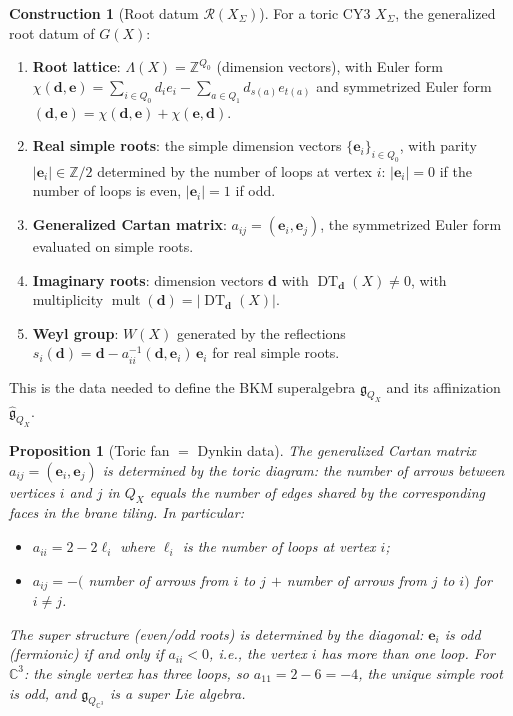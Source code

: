 \documentclass[11pt]{article}
\newtheorem{proposition}[theorem]{Proposition}
\theoremstyle{definition}
\newtheorem{construction}[theorem]{Construction}
\theoremstyle{remark}
\newcommand{\ZZ}{\mathbb{Z}}
\newcommand{\CC}{\mathbb{C}}
\newcommand{\cR}{\mathcal{R}}
\newcommand{\frakg}{\mathfrak{g}}
\newcommand{\DT}{\operatorname{DT}}
\begin{document}
\begin{construction}[Root datum $\cR(X_\Sigma)$]
\label{constr:root-datum-toric}
For a toric CY3 $X_\Sigma$, the generalized root datum of $G(X)$:
\begin{enumerate}[label=(\roman*)]
 \item \textbf{Root lattice}: $\Lambda(X) = \ZZ^{Q_0}$ (dimension vectors),
 with Euler form $\chi(\mathbf{d}, \mathbf{e}) =
 \sum_{i \in Q_0} d_i e_i - \sum_{a \in Q_1} d_{s(a)} e_{t(a)}$
 and symmetrized Euler form
 $(\mathbf{d}, \mathbf{e}) = \chi(\mathbf{d}, \mathbf{e}) + \chi(\mathbf{e}, \mathbf{d})$.
 \item \textbf{Real simple roots}: the simple dimension vectors
 $\{\mathbf{e}_i\}_{i \in Q_0}$, with parity $|\mathbf{e}_i| \in \ZZ/2$ determined
 by the number of loops at vertex $i$: $|\mathbf{e}_i| = 0$ if the number
 of loops is even, $|\mathbf{e}_i| = 1$ if odd.
 \item \textbf{Generalized Cartan matrix}: $a_{ij} = (\mathbf{e}_i, \mathbf{e}_j)$,
 the symmetrized Euler form evaluated on simple roots.
 \item \textbf{Imaginary roots}: dimension vectors $\mathbf{d}$ with
 $\DT_{\mathbf{d}}(X) \neq 0$, with multiplicity
 $\operatorname{mult}(\mathbf{d}) = |\DT_{\mathbf{d}}(X)|$.
 \item \textbf{Weyl group}: $W(X)$ generated by the reflections
 $s_i(\mathbf{d}) = \mathbf{d} - a_{ii}^{-1}(\mathbf{d}, \mathbf{e}_i)\, \mathbf{e}_i$
 for real simple roots.
\end{enumerate}
This is the data needed to define the BKM superalgebra $\frakg_{Q_X}$
and its affinization $\widehat{\frakg}_{Q_X}$.
\end{construction}

\begin{proposition}[Toric fan $=$ Dynkin data]
\label{prop:fan-dynkin}
The generalized Cartan matrix $a_{ij} = (\mathbf{e}_i, \mathbf{e}_j)$ is
determined by the toric diagram: the number of arrows between vertices $i$ and $j$
in $Q_X$ equals the number of edges shared by the corresponding faces in the brane
tiling. In particular:
\begin{itemize}
 \item $a_{ii} = 2 - 2\ell_i$ where $\ell_i$ is the number of loops at vertex $i$;
 \item $a_{ij} = -($ number of arrows from $i$ to $j$ $+$ number of arrows from
 $j$ to $i)$ for $i \neq j$.
\end{itemize}
The super structure (even/odd roots) is determined by the diagonal: $\mathbf{e}_i$
is odd (fermionic) if and only if $a_{ii} < 0$, i.e., the vertex $i$ has
more than one loop. For $\CC^3$: the single vertex has three loops, so
$a_{11} = 2 - 6 = -4$, the unique simple root is odd, and $\frakg_{Q_{\CC^3}}$
is a super Lie algebra.
\end{proposition}
\end{document}
